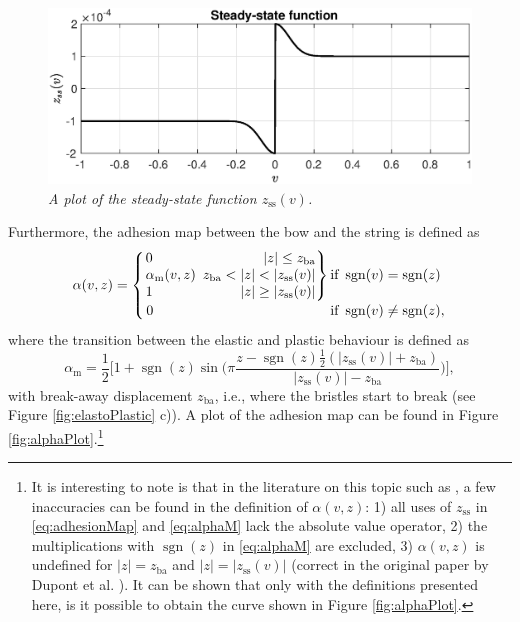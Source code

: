 \documentclass[twoside,a4paper,dvipsnames]{article}
\newenvironment{rcases}
  {\left.\begin{alignedat}{2}}
  {\end{alignedat}\right\rbrace}
\DeclareMathOperator{\sgn}{sgn}
\begin{document}
\begin{figure}[ht]
\centerline{\includegraphics[width=1.0\columnwidth]{steadyState.eps}}
\caption{\label{fig:zss}{\it A plot of the steady-state function $z_\text{ss}(v)$.}}
\end{figure}
Furthermore, the adhesion map between the bow and the string is defined as
\begin{equation}\label{eq:adhesionMap}
\alpha(v, z) = 
\begin{aligned}
    \begin{cases}
    \begin{rcases}
        &0 & |z| \leq z_\text{ba}\\
       &\alpha_\text{m}(v,z)&\ \, z_\text{ba}<|z|<|z_\text{ss}(v)|\\        &1 &|z|\geq|z_\text{ss}(v)|
        \end{rcases} 
        
        &\!\!\!\!\!\text{if}\  \sgn(v)=\sgn(z)\\
        \,0&\!\!\!\!\!\text{if}\  \sgn(v)\neq\sgn(z),
    \end{cases}
    \end{aligned}
\end{equation}
where the transition between the elastic and plastic behaviour is defined as
\begin{equation}\label{eq:alphaM}
    \alpha_\text{m} = \frac{1}{2}\bigg[1+\sgn(z)\sin\bigg(\pi\frac{z-\sgn(z)\frac{1}{2}(|z_\text{ss}(v)|+z_\text{ba})}{|z_\text{ss}(v)|-z_\text{ba}}\bigg)\bigg],
\end{equation}
with break-away displacement $z_\text{ba}$, i.e., where the bristles start to break (see Figure \ref{fig:elastoPlastic} c)). A plot of the adhesion map can be found in Figure \ref{fig:alphaPlot}.\footnote{It is interesting to note is that in the literature on this topic such as \cite{Dupont2002, Serafin2003, Serafin2004, Avanzini2005}, a few inaccuracies can be found in the definition of $\alpha(v,z)$: 1) all uses of $z_\text{ss}$ in \eqref{eq:adhesionMap} and \eqref{eq:alphaM} lack the absolute value operator, 2) the multiplications with $\sgn(z)$ in \eqref{eq:alphaM} are excluded, 3) $\alpha(v,z)$ is undefined for $|z|=z_\text{ba}$ and $|z|=|z_\text{ss}(v)|$ (correct in the original paper by Dupont et al. \cite{Dupont2002}). It can be shown that only with the definitions presented here, is it possible to obtain the curve shown in Figure \ref{fig:alphaPlot}.}
\end{document}
